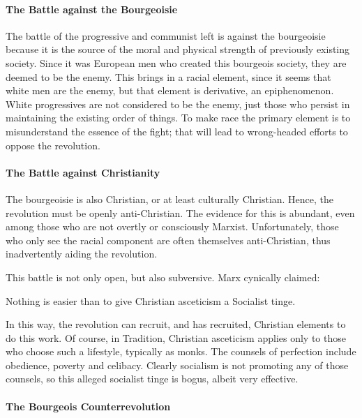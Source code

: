 \paragraph{The Battle against the Bourgeoisie}


The battle of the progressive and communist left is against the bourgeoisie because it is the source of the moral and physical strength of previously existing society. Since it was European men who created this bourgeois society, they are deemed to be the enemy. This brings in a racial element, since it seems that white men are the enemy, but that element is derivative, an epiphenomenon. White progressives are not considered to be the enemy, just those who persist in maintaining the existing order of things. To make race the primary element is to misunderstand the essence of the fight; that will lead to wrong-headed efforts to oppose the revolution.

\paragraph{The Battle against Christianity}


The bourgeoisie is also Christian, or at least culturally Christian. Hence, the revolution must be openly anti-Christian. The evidence for this is abundant, even among those who are not overtly or consciously Marxist. Unfortunately, those who only see the racial component are often themselves anti-Christian, thus inadvertently aiding the revolution.

This battle is not only open, but also subversive. Marx cynically claimed:

\begin{quotex}
Nothing is easier than to give Christian asceticism a Socialist tinge.
\end{quotex}


In this way, the revolution can recruit, and has recruited, Christian elements to do this work. Of course, in Tradition, Christian asceticism applies only to those who choose such a lifestyle, typically as monks. The counsels of perfection include obedience, poverty and celibacy. Clearly socialism is not promoting any of those counsels, so this alleged socialist tinge is bogus, albeit very effective.

\paragraph{The Bourgeois Counterrevolution}


